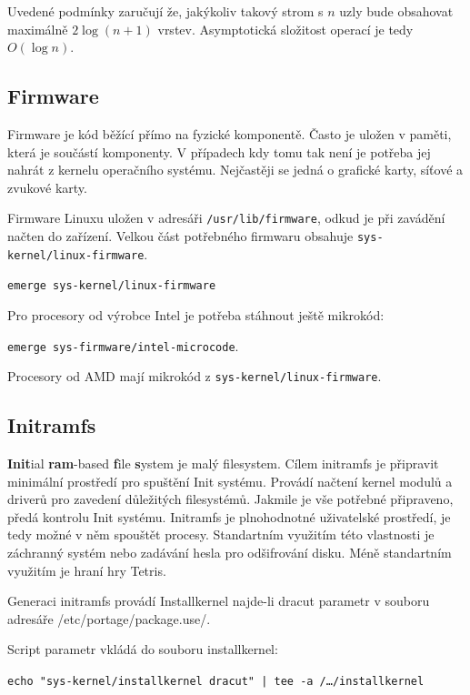 \documentclass[12pt,a4paper,twoside,]{article}
\begin{document}
{{{{{{{Uvedené podmínky zaručují že, jakýkoliv takový strom s $n$ uzly bude obsahovat maximálně $2\log(n+1)$ vrstev. Asymptotická složitost operací je tedy $O(\log n)$.\\



\subsection{\textsf{Firmware}}
Firmware je kód běžící přímo na fyzické komponentě. Často je uložen v paměti, která je součástí komponenty. V případech kdy tomu tak není je potřeba jej nahrát z kernelu operačního systému. Nejčastěji se jedná o grafické karty, síťové a zvukové karty. 

Firmware Linuxu uložen v adresáři \texttt{/usr/lib/firmware}, odkud je při zavádění načten do zařízení. Velkou část potřebného firmwaru obsahuje \texttt{sys-kernel/linux-firmware}. 

\texttt{emerge sys-kernel/linux-firmware}

\hspace{-1.5em}Pro procesory od výrobce Intel je potřeba stáhnout ještě mikrokód:

\texttt{emerge sys-firmware/intel-microcode}. 

\hspace{-1.5em}Procesory od AMD mají mikrokód z \texttt{sys-kernel/linux-firmware}.
\subsection{\textsf{Initramfs}} \hypertarget{Initramfs}{}
{\bf Init}ial {\bf ram}-based {\bf f}ile {\bf s}ystem je malý filesystem. Cílem initramfs je připravit minimální prostředí pro spuštění Init systému. Provádí načtení kernel modulů a driverů pro zavedení důležitých filesystémů. Jakmile je vše potřebné připraveno, předá kontrolu Init systému.
Initramfs je plnohodnotné uživatelské prostředí, je tedy možné v něm spouštět procesy. Standartním využitím této vlastnosti je záchranný systém nebo zadávání hesla pro odšifrování disku. Méně standartním využitím je hraní hry Tetris. 

Generaci initramfs provádí Installkernel najde-li dracut parametr v souboru adresáře /etc/portage/package.use/.

\hspace{-1.5em}Script parametr vkládá do souboru installkernel:

\texttt{echo "sys-kernel/installkernel dracut" | tee -a /\dots/installkernel}

}}}}}}}
\end{document}
